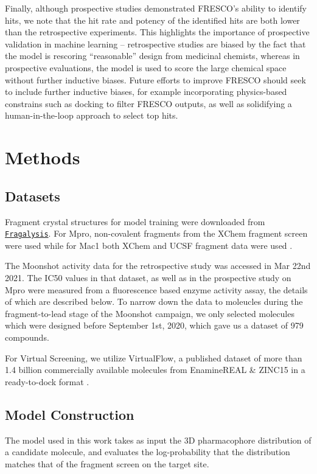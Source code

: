 Finally, although prospective studies demonstrated FRESCO's ability to identify hits, we note that the hit rate and potency of the identified hits are both lower than the retrospective experiments. This highlights the importance of prospective validation in machine learning -- retrospective studies are biased by the fact that the model is rescoring ``reasonable'' design from medicinal chemists, whereas in prospective evaluations, the model is used to score the large chemical space without further inductive biases. Future efforts to improve FRESCO should seek to include further inductive biases, for example incorporating physics-based constrains such as docking to filter FRESCO outputs, as well as solidifying a human-in-the-loop approach to select top hits. 

\section{Methods} \label{sec:methods}
\subsection{Datasets} \label{subsec:datasets}

Fragment crystal structures for model training were downloaded from \href{https://fragalysis.diamond.ac.uk/viewer/react/landing}{\texttt{Fragalysis}}. For Mpro, non-covalent fragments from the XChem fragment screen \cite{Douangamath2020XChem} were used while for Mac1 both XChem and UCSF fragment data were used \cite{Schuller2021Mac1Frag}.

The Moonshot activity data for the retrospective study was accessed in Mar 22nd 2021. The IC50 values in that dataset, as well as in the prospective study on Mpro were measured from a fluorescence based enzyme activity assay, the details of which are described below. To narrow down the data to moleucles during the fragment-to-lead stage of the Moonshot campaign, we only selected molecules which were designed before September 1st, 2020, which gave us a dataset of 979 compounds.

For Virtual Screening, we utilize VirtualFlow, a published dataset of more than 1.4 billion commercially available molecules from EnamineREAL \& ZINC15 in a ready-to-dock format \cite{Gorgulla2020VirtualFlow}.

\subsection{Model Construction} \label{subsec:model_construction}
The model used in this work takes as input the 3D pharmacophore distribution of a candidate molecule, and evaluates the log-probability that the distribution matches that of the fragment screen on the target site.

